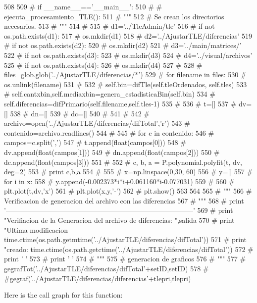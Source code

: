 \begin{DoxyCode}
508 
509 # if __name__=='__main__':
510 # #    ejecuta_procesamiento_TLE():
511 #     """
512 #     Se crean los directorios necesarios.
513 #     """
514 # 
515 #     d1='../TleAdmin/tle'
516 #     if not os.path.exists(d1):
517 #         os.mkdir(d1)
518 #     d2='../AjustarTLE/diferencias'
519 #     if not os.path.exists(d2):
520 #         os.mkdir(d2)
521 #     d3='../main/matrices/'
522 #     if not os.path.exists(d3):
523 #         os.mkdir(d3)
524 #     d4='../visual/archivos'
525 #     if not os.path.exists(d4):
526 #         os.mkdir(d4)
527 #         
528 #     files=glob.glob('../AjustarTLE/diferencias/*')
529 #     for filename in files:
530 #         os.unlink(filename)
531 #         
532 #     self.bin=difTle(self.tleOrdenados, self.tles)
533 #     self.cantxbin,self.mediaxbin=genera_estadisticaBin(self.bin)
534 #     self.diferencias=difPrimario(self.filename,self.tles-1)
535 # 
536 #     t=[]
537 #     dv=[]
538 #     dn=[]
539 #     dc=[]
540 #     
541 #     
542 #     archivo=open('../AjustarTLE/diferencias/difTotal','r')
543 #     contenido=archivo.readlines()
544 #     
545 #     for c in contenido:
546 #         campos=c.split(',')
547 #         t.append(float(campos[0]))
548 #         dv.append(float(campos[1]))
549 #         dn.append(float(campos[2]))
550 #         dc.append(float(campos[3]))
551 #         
552 #     c, b, a = P.polynomial.polyfit(t, dv, deg=2)
553 #     print c,b,a
554 #     
555 #     x=np.linspace(0,30, 60)
556 #     y=[]
557 #     for i in x:
558 #         y.append(-0.002373*i*i+0.061160*i-0.077031)
559 #     
560 #     plt.plot(t,dv,'x')
561 #     plt.plot(x,y,'-')
562 #     plt.show()
563     
564 
565 #     """
566 #     Verificacion de generacion del archivo con las diferencias
567 #     """
568 #     print
       '---------------------------------------------------------------------------------'
569 #     print "Verifiacion de la Generacion del archivo de diferencias: ",salida
570 #     print "Ultima modificacion %
       time.ctime(os.path.getmtime('../AjustarTLE/diferencias/difTotal'))
571 #     print "creado: %
       time.ctime(os.path.getctime('../AjustarTLE/diferencias/difTotal'))
572 #     print ' '
573 #     print ' '
574 #     """
575 #     generacion de graficos
576 #     """ 
577         # gegrafTot('../AjustarTLE/diferencias/difTotal'+setID,setID)
578     
    #     #gegraf('../AjustarTLE/diferencias/diferencias'+tlepri,tlepri)\end{DoxyCode}


\-Here is the call graph for this function\-:




